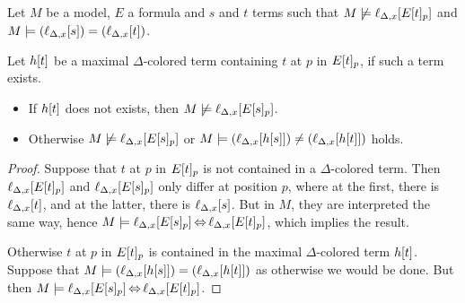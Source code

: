 \documentclass[,%
	paper=a4,%
	DIV14, 
	liststotoc,
	bibtotoc,
	draft=false,%
	numbers=noendperiod
]{scrartcl}
\newcommand{\lif}[1]{\lift{\Delta}{#1}{x}}
\begin{document}
\begin{lemma}
	\label{aga5tg5ba}
	Let $M$ be a model, $E$ a formula and $s$ and $t$ terms such that
	$M\notentails \lif{E\occurat{t}{p}}$ 
	and
	$M \entails (\lif{s}) = (\lif{t})$.

	Let $h[t]$ be a maximal $\Delta$-colored term containing $t$ at $p$ in $E{[t]_{p}}$, if such a term exists.
\begin{itemize}
\item If $h[t]$ does not exists, then
		$M\notentails \lif{E\occurat{s}{p}}$.
\item Otherwise
		$M\notentails \lif{E\occurat{s}{p}}$
	or $M\entails (\lif{h\occur{s}}) \neq (\lif{h\occur{t}})$ holds.
\end{itemize}
\end{lemma}
\begin{proof} 
	Suppose that $t$ at $p$ in $E{[t]_{p}}$ is not contained in a $\Delta$-colored term.
	Then $\lif{E\occurat{t}{p}}$ and $\lif{E\occurat{s}{p}}$ only differ at position $p$, where at the first, there is $\lif{t}$, and at the latter, there is $\lif{s}$. But in $M$, they are interpreted the same way, hence $M\entails \lif{E\occurat{s}{p}} \semiff \lif{E\occurat{t}{p}}$, which implies the result.

	Otherwise $t$ at $p$ in $E{[t]_{p}}$ is contained in the maximal $\Delta$-colored term $h[t]$.
	Suppose that $M\entails (\lif{h\occur{s}})  = (\lif{h\occur{t}})$ as otherwise we would be done.
	But then $M \entails \lif{E\occurat{s}{p}} \semiff{} \lif{E\occurat{t}{p}}$.
\end{proof} 
\end{document}
